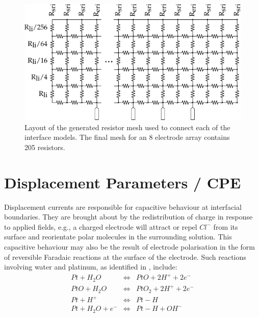 \documentclass[journal, a4paper]{IEEEtran}
\begin{document}
\begin{figure}
    \begin{center}
        \includegraphics[width=\columnwidth]{graphics/resistorMesh_sideways}
    \end{center}
    \caption{Layout of the generated resistor mesh used to connect each of the interface models. The final mesh for an 8 electrode array contains 205 resistors.}
    \label{fig:mesh}
\end{figure}



\section{Displacement Parameters {\color{blue}/ CPE}}
\label{sect:cpe}
Displacement currents are responsible for capacitive behaviour at interfacial boundaries.
They are brought about by the redistribution of charge in response to applied fields, {\color{blue}e.g.,} a charged electrode will attract or repel $Cl^{-}$ from its surface and reorientate polar molecules in the surrounding solution.\cite{Merrill05} This capacitive behaviour may also be the result of electrode polarisation in the form of reversible Faradaic reactions at the surface of the electrode.
Such reactions involving water and platinum, as identified in \cite{Horch2004,Mohtashami2011,Merrill05}, include:
\begin{eqnarray}
    Pt + H_{2}O &\Leftrightarrow& PtO + 2 H^{+} + 2 e^{-}\\
    PtO + H_{2}O &\Leftrightarrow& PtO_{2} + 2 H^{+} + 2e^{-}\\
    Pt + H^{+} & \Leftrightarrow & Pt-H\\
    Pt + H_{2}O + e^{-} &\Leftrightarrow& Pt-H+OH^{-}
\end{eqnarray}
\end{document}
